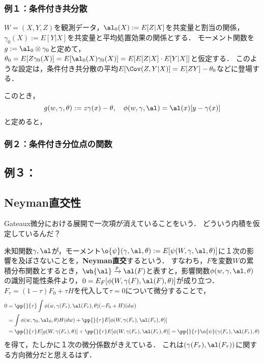 \documentclass[uplatex,dvipdfmx]{jsreport}
\begin{document}
\subsubsection{例１：条件付き共分散}

\begin{example}
    $W=(X,Y,Z)$を観測データ，$\al_0(X):=E[Z|X]$を共変量と割当の関係，$\gamma_0(X):=E[Y|X]$を共変量と平均処置効果の関係とする．
    モーメント関数を$g:=\al_0\otimes\gamma_0$と定めて，$\theta_0=E[Z\gamma_0(X)]=E[\al_0(X)\gamma_0(X)]=E[E[Z|X]\cdot E[Y|X]]$と仮定する．
    このような設定は，条件付き共分散の平均$E[\Cov(Z,Y|X)]=E[ZY]-\theta_0$などに登場する．

    このとき，
    \[g(w,\gamma,\theta):=z\gamma(x)-\theta,\quad\phi(w,\gamma,\al)=\al(x)[y-\gamma(x)]\]
    と定めると，
\end{example}

\subsubsection{例２：条件付き分位点の関数}

\subsection{例３：}

\subsection{Neyman直交性}

\begin{tcolorbox}[colframe=ForestGreen, colback=ForestGreen!10!white,breakable,colbacktitle=ForestGreen!40!white,coltitle=black,fonttitle=\bfseries\sffamily,
title=]
    Gateaux微分における展開で一次項が消えていることをいう．
    どういう内積を仮定しているんだ？
\end{tcolorbox}

\begin{definition}
    未知関数$\gamma,\al$が，モーメント$\o{\psi}(\gamma,\al,\theta):=E[\psi(W,\gamma,\al,\theta)]$に１次の影響を及ぼさないことを，\textbf{Neyman直交}するという．
    すなわち，$F$を変数$W$の累積分布関数とするとき，$\wh{\al}\xrightarrow{p}\al(F)$と表すと，影響関数$\phi(w,\gamma,\al,\theta)$の識別可能性条件より，$0=E_F[\phi(W,\gamma(F),\al(F),\theta)]$が成り立つ．
    $F_\tau=(1-\tau)F_0+\tau H$を代入して$\tau=0$について微分することで，
    \begin{align*}
        0&=\pp{}{\tau}\int\phi(w,\gamma(F_\tau),\al(F_\tau),\theta)(-F_0+H)(dw)\\
        &=\int\phi(w,\gamma_0,\al_0,\theta)H(dw)+\pp{}{\tau}E[\phi(W,\gamma(F_\tau),\al(F_\tau),\theta)]\\
        &=\pp{}{\tau}E[g(W,\gamma(F_\tau),\theta)]+\pp{}{\tau}E[\phi(W,\gamma(F_\tau),\al(F_\tau),\theta)]=\pp{}{\tau}\o{\psi}(\gamma(F_\tau),\al(F_\tau),\theta)
    \end{align*}
    を得て，たしかに１次の微分係数がきえている．
    これは$(\gamma(F_\tau),\al(F_\tau))$に関する方向微分だと思えるはず．
\end{definition}
\end{document}
